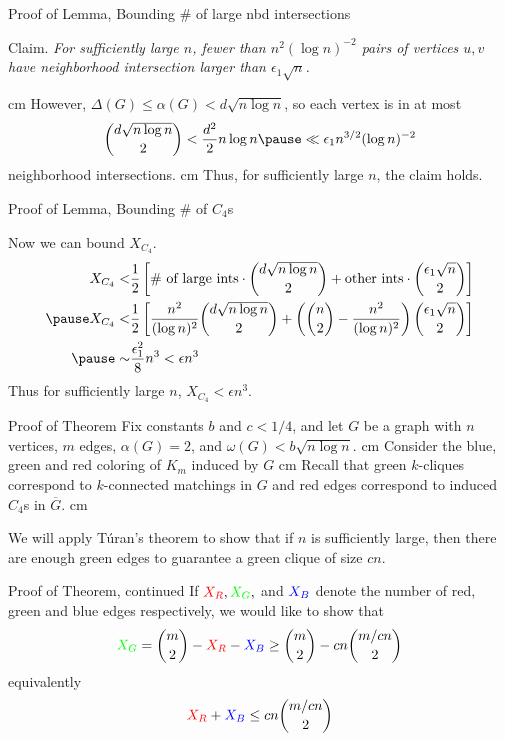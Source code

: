 \documentclass{beamer}
\newcommand{\bframe}[2]{\begin{frame}{#1}#2\end{frame}}
\begin{document}
\bframe{Proof of Lemma, Bounding \# of large nbd intersections} {
\begin{framed} Claim. \textit{For sufficiently large $n$, fewer than $n^2(\log n)^{-2}$ pairs of vertices $u,v$ have neighborhood intersection larger than $\epsilon_1\sqrt{n}$.}
\end{framed}\vskip 0.5 cm
However, $\Delta(G) \leq \alpha(G) < d\sqrt{n\log n}$, so each vertex is in at most\pause \[{d\sqrt{n\log n}\choose 2 } < \frac{d^2}{2}n\log n \pause \ll \epsilon_1n^{3/2}(\log n)^{-2}\] \pause neighborhood intersections. \pause \vskip 0.5 cm
  Thus, for sufficiently large $n$,  the claim holds.
}

\bframe{Proof of Lemma, Bounding \# of $C_4$s}{

Now we can bound $X_{C_4}$.\pause
\begin{eqnarray*}
X_{C_4} <&\frac{1}{2}\left[ \makebox{\# of large ints} \cdot {d\sqrt{n\log n}\choose 2} + \makebox{other ints}\cdot{\epsilon_1\sqrt{n}\choose 2}\right]\\ \pause
X_{C_4} <& \frac{1}{2}\left[\frac{n^2}{(\log n)^2}{d\sqrt{n\log n}\choose 2}+ \left( {n\choose 2}- \frac{n^2}{(\log n)^2}\right){\epsilon_1\sqrt{n}\choose 2}\right]\\\pause
\sim& \frac{\epsilon_1^2}{8}n^3 < \epsilon n^3
\end{eqnarray*}\pause
Thus for sufficiently large $n$, $X_{C_4} < \epsilon n^3$.
}


\bframe{Proof of Theorem}{
\pause
Fix constants $b$ and $c < 1/4$, and let $G$ be a graph with $n$ vertices, $m$ edges, $\alpha(G) = 2$, and $\omega(G) < b\sqrt{n\log n}$. \pause \vskip 0.5 cm
Consider the blue, green and red coloring of $K_m$ induced by $G$ \pause\vskip 0.5 cm
 Recall that green $k$-cliques correspond to $k$-connected matchings in $G$ and red edges correspond to induced $C_4$s in $\overline{G}$. \pause \vskip 0.5 cm

We will apply T\'{u}ran's theorem to show that if $n$ is sufficiently large, then there are enough green edges to guarantee a green clique of size $cn$.

}

\bframe{Proof of Theorem, continued}{
 If ${\color{red}X_R}, {\color{green}X_G},$ and ${\color{blue}X_B}$ denote the number of red, green and blue edges respectively, we would like to show that\pause \[{\color{green}X_G} = {m\choose 2} - {\color{red}X_R} - {\color{blue}X_B} \geq {m\choose 2} - cn{m/cn\choose 2}\] \pause 
equivalently \pause
\begin{equation}
	{\color{red}X_R} + {\color{blue}X_B} \leq cn{m/cn\choose 2}\label{goal}
\end{equation}
}
\end{document}
